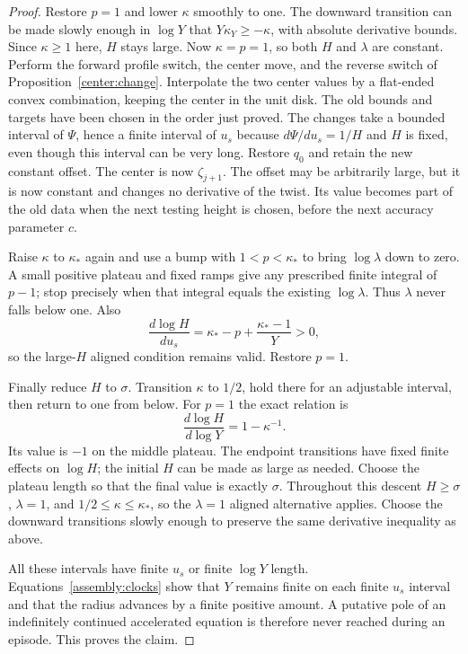 \begin{proof}
Restore $p=1$ and lower $\kappa$ smoothly to one. The downward
transition can be made slowly enough in $\log Y$ that
$Y\kappa_Y\geq-\kappa$, with absolute derivative bounds.
Since $\kappa\geq1$ here, $H$ stays large. Now $\kappa=p=1$,
so both $H$ and $\lambda$ are constant. Perform the forward
profile switch, the center move, and the reverse switch of
Proposition~\ref{center:change}. Interpolate the two center
values by a flat-ended convex combination, keeping the center
in the unit disk. The old bounds and targets have been chosen
in the order just proved. The changes take a bounded interval
of $\Psi$, hence a finite interval of $u_s$ because
$d\Psi/du_s=1/H$ and $H$ is fixed, even though this interval
can be very long. Restore $q_0$ and retain the new constant
offset. The center is now $\zeta_{j+1}$. The offset may be arbitrarily
large, but it is now constant and changes no derivative of the twist. Its
value becomes part of the old data when the next testing height is
chosen, before the next accuracy parameter $c$.

Raise $\kappa$ to $\kappa_*$ again and use a bump with
$1<p<\kappa_*$ to bring $\log\lambda$ down to zero.
A small positive plateau and fixed ramps give any prescribed
finite integral of $p-1$; stop precisely when that integral
equals the existing $\log\lambda$. Thus $\lambda$ never falls
below one. Also
\[
 \frac{d\log H}{du_s}
 =\kappa_*-p+\frac{\kappa_*-1}{Y}>0,
\]
so the large-$H$ aligned condition remains valid. Restore $p=1$.

Finally reduce $H$ to $\sigma$. Transition $\kappa$ to $1/2$,
hold there for an adjustable interval, then return to one from
below. For $p=1$ the exact relation is
\begin{equation}\label{assembly:H-descent}
 \frac{d\log H}{d\log Y}=1-\kappa^{-1}.
\end{equation}
Its value is $-1$ on the middle plateau. The endpoint transitions
have fixed finite effects on $\log H$; the initial $H$ can be
made as large as needed. Choose the plateau length so that the
final value is exactly $\sigma$. Throughout this descent
$H\geq\sigma$, $\lambda=1$, and $1/2\leq\kappa\leq\kappa_*$,
so the $\lambda=1$ aligned alternative applies. Choose the
downward transitions slowly enough to preserve the same
derivative inequality as above.

All these intervals have finite $u_s$ or finite $\log Y$ length.
Equations~\eqref{assembly:clocks} show that $Y$ remains finite
on each finite $u_s$ interval and that the radius advances by
a finite positive amount. A putative pole of an indefinitely
continued accelerated equation is therefore never reached
during an episode. This proves the claim.
\end{proof}


